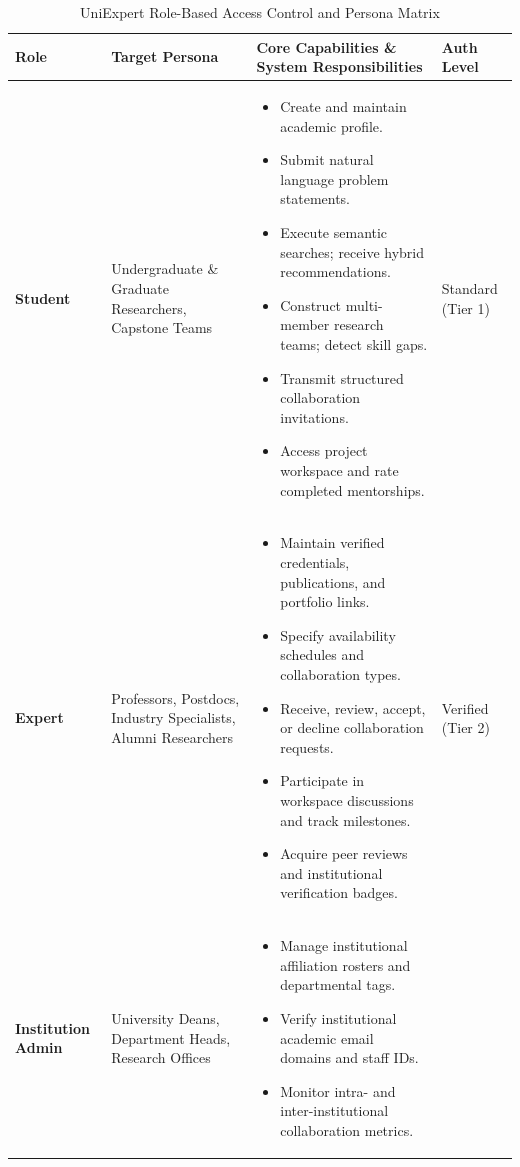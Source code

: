 \documentclass[11pt,a4paper]{article}
\begin{document}
\begin{table}[htbp]
\centering
\small
\caption{UniExpert Role-Based Access Control and Persona Matrix}
\label{tab:user_roles}
\begin{tabularx}{\textwidth}{@{}l p{3.2cm} X l@{}}
\toprule
\textbf{Role} & \textbf{Target Persona} & \textbf{Core Capabilities \& System Responsibilities} & \textbf{Auth Level} \\
\midrule
\textbf{Student} & Undergraduate \& Graduate Researchers, Capstone Teams & 
\begin{itemize}[leftmargin=*,noitemsep]
    \item Create and maintain academic profile.
    \item Submit natural language problem statements.
    \item Execute semantic searches; receive hybrid recommendations.
    \item Construct multi-member research teams; detect skill gaps.
    \item Transmit structured collaboration invitations.
    \item Access project workspace and rate completed mentorships.
\end{itemize} & Standard (Tier 1) \\
\addlinespace
\textbf{Expert} & Professors, Postdocs, Industry Specialists, Alumni Researchers & 
\begin{itemize}[leftmargin=*,noitemsep]
    \item Maintain verified credentials, publications, and portfolio links.
    \item Specify availability schedules and collaboration types.
    \item Receive, review, accept, or decline collaboration requests.
    \item Participate in workspace discussions and track milestones.
    \item Acquire peer reviews and institutional verification badges.
\end{itemize} & Verified (Tier 2) \\
\addlinespace
\textbf{Institution Admin} & University Deans, Department Heads, Research Offices & 
\begin{itemize}[leftmargin=*,noitemsep]
    \item Manage institutional affiliation rosters and departmental tags.
    \item Verify institutional academic email domains and staff IDs.
    \item Monitor intra- and inter-institutional collaboration metrics.

\end{itemize}
\end{tabularx}
\end{table}
\end{document}
